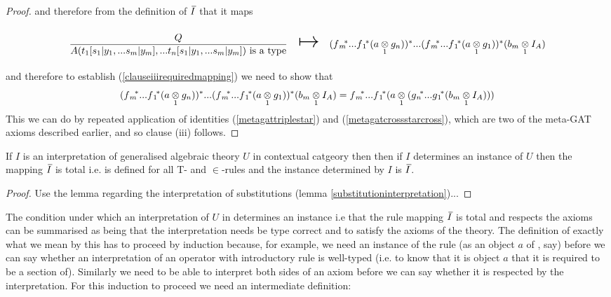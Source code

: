 \begin{proof}
and therefore from the definition of $\Ibar$ that it maps
\begin{equation*}
\begin{array}{c c c}
\forceSOURCEwidth & & \forceTARGETwidth \\ [-0.1cm]
\gatdisplayrule{Q}{\isT{A(t_1[\ssubbedfory],...t_n[\ssubbedfory])}}  & \Imapsto & \clausethreelhs \\ [0.4cm]
\end{array}
\end{equation*}
and therefore to establish (\ref{clauseiiirequiredmapping}) we need to show that
\begin{equation*}
(f{_m}\kern-.25em^*...f{_1}\kern-.15em^* (a \underset{1}{\otimes} g_n))^* ... (f{_m}\kern-.25em^*...f{_1}\kern-.15em^* (a \underset{1}{\otimes} g_1)) ^* (b_m \underset{1}{\otimes} I_A) = f{_m}\kern-.25em^*...f{_1}\kern-.15em^* ( a \underset{1}{\otimes} (g{_n}\kern-.2em^*...g{_1}\kern-.15em^*(b_m \underset{1}{\otimes} I_A)) )										
\end{equation*}
This we can do by repeated application of identities (\ref{metagattriplestar})
and (\ref{metagatcrossstarcross}), which are two of the meta-GAT axioms described earlier,
and so clause (iii) follows.


\iffalse
[(iv)] if, in addition, $r_s$ is the rule \srule and is  derived rule of $U$ that is mapped by $I$
to a section $g$ of \catcw
then the rule \srulesubstituted[,] which is a derived rule of $U$ by virtue of the substitution lemma, is mapped by $I$ 
to the section $\fmstar...\fonestar (\crossx{a}{g}{1})$ of \catcw
\fi

\end{proof}

\begin{lemma} 
If $I$ is an interpretation of generalised algebraic theory $U$ in contextual catgeory \catcw then then if $I$ determines an instance of $U$ then the
mapping $\Ibar$  is total i.e. is defined for all T- and $\in$-rules and the instance determined by $I$ is $\Ibar$.
\end{lemma}
\begin{proof}  
Use the lemma regarding the interpretation of substitutions (lemma \ref{substitutioninterpretation})...
\end{proof}

The condition under which an interpretation of $U$ in \catcw determines an instance i.e that the rule mapping $\Ibar$ is total and respects the axioms can be summarised as being that the interpretation needs be type correct and to satisfy the axioms of the theory. The definition of exactly what we mean by this has to proceed by induction because, for example, we need an instance of the rule
 (as an object $a$ of \catc, say) before we can say whether an interpretation of an operator with introductory rule \genericfintroductoryrule
is well-typed (i.e. to know that it is object $a$ that it is required to be a section of).
Similarly we need to be able to interpret both sides of an axiom before we can say whether it is respected
by the interpretation. For this induction to proceed we need an intermediate definition:

